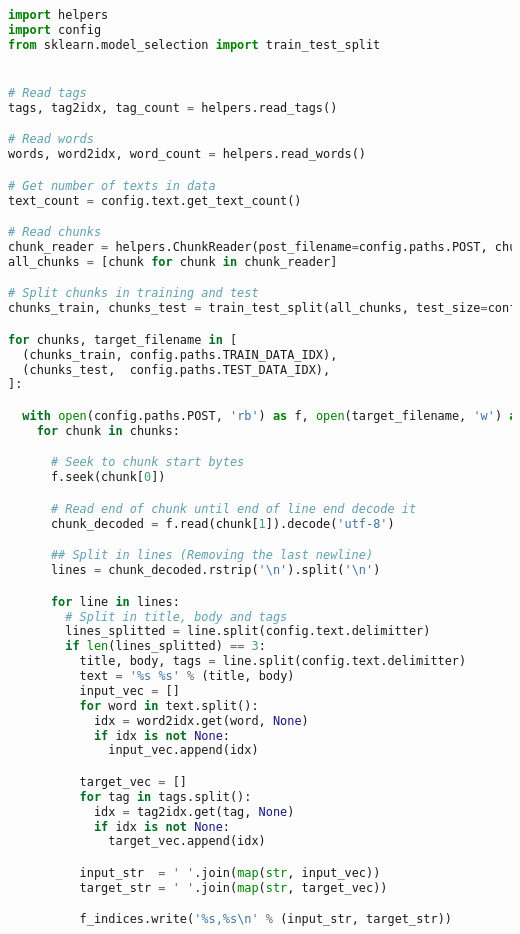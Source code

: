 \begin{lstlisting}[language=python]
import helpers
import config
from sklearn.model_selection import train_test_split


# Read tags
tags, tag2idx, tag_count = helpers.read_tags()

# Read words
words, word2idx, word_count = helpers.read_words()

# Get number of texts in data
text_count = config.text.get_text_count()

# Read chunks
chunk_reader = helpers.ChunkReader(post_filename=config.paths.POST, chunk_size=config.data.CHUNK_SIZE) # TODO: Change
all_chunks = [chunk for chunk in chunk_reader]

# Split chunks in training and test
chunks_train, chunks_test = train_test_split(all_chunks, test_size=config.data.TEST_FRACTION)

for chunks, target_filename in [
  (chunks_train, config.paths.TRAIN_DATA_IDX),
  (chunks_test,  config.paths.TEST_DATA_IDX),
]:

  with open(config.paths.POST, 'rb') as f, open(target_filename, 'w') as f_indices:
    for chunk in chunks:

      # Seek to chunk start bytes
      f.seek(chunk[0])

      # Read end of chunk until end of line end decode it
      chunk_decoded = f.read(chunk[1]).decode('utf-8')

      ## Split in lines (Removing the last newline)
      lines = chunk_decoded.rstrip('\n').split('\n')

      for line in lines:
        # Split in title, body and tags
        lines_splitted = line.split(config.text.delimitter)
        if len(lines_splitted) == 3:
          title, body, tags = line.split(config.text.delimitter)
          text = '%s %s' % (title, body)
          input_vec = []
          for word in text.split():
            idx = word2idx.get(word, None)
            if idx is not None:
              input_vec.append(idx)

          target_vec = []
          for tag in tags.split():
            idx = tag2idx.get(tag, None)
            if idx is not None:
              target_vec.append(idx)

          input_str  = ' '.join(map(str, input_vec))
          target_str = ' '.join(map(str, target_vec))

          f_indices.write('%s,%s\n' % (input_str, target_str))
\end{lstlisting}


